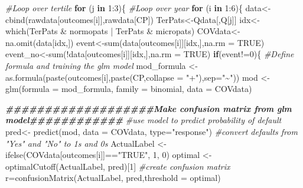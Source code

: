 \documentclass[
]{article}
\newenvironment{Shaded}{\begin{snugshade}}{\end{snugshade}}
\newcommand{\AttributeTok}[1]{\textcolor[rgb]{0.77,0.63,0.00}{#1}}
\newcommand{\CommentTok}[1]{\textcolor[rgb]{0.56,0.35,0.01}{\textit{#1}}}
\newcommand{\ConstantTok}[1]{\textcolor[rgb]{0.00,0.00,0.00}{#1}}
\newcommand{\ControlFlowTok}[1]{\textcolor[rgb]{0.13,0.29,0.53}{\textbf{#1}}}
\newcommand{\DecValTok}[1]{\textcolor[rgb]{0.00,0.00,0.81}{#1}}
\newcommand{\DocumentationTok}[1]{\textcolor[rgb]{0.56,0.35,0.01}{\textbf{\textit{#1}}}}
\newcommand{\FunctionTok}[1]{\textcolor[rgb]{0.00,0.00,0.00}{#1}}
\newcommand{\NormalTok}[1]{#1}
\newcommand{\OtherTok}[1]{\textcolor[rgb]{0.56,0.35,0.01}{#1}}
\newcommand{\SpecialCharTok}[1]{\textcolor[rgb]{0.00,0.00,0.00}{#1}}
\newcommand{\StringTok}[1]{\textcolor[rgb]{0.31,0.60,0.02}{#1}}
\begin{document}
\begin{Shaded}
\begin{Highlighting}[]
\CommentTok{\#Loop over tertile}
\ControlFlowTok{for}\NormalTok{ (j }\ControlFlowTok{in} \DecValTok{1}\SpecialCharTok{:}\DecValTok{3}\NormalTok{)\{}
  \CommentTok{\#Loop over year}
  \ControlFlowTok{for}\NormalTok{ (i }\ControlFlowTok{in} \DecValTok{1}\SpecialCharTok{:}\DecValTok{6}\NormalTok{)\{}
\NormalTok{    data}\OtherTok{\textless{}{-}}\FunctionTok{cbind}\NormalTok{(rawdata[outcomes[i]],rawdata[CP])}
\NormalTok{    TerPats}\OtherTok{\textless{}{-}}\NormalTok{Qdata[,Q[j]]}
\NormalTok{    idx}\OtherTok{\textless{}{-}}\FunctionTok{which}\NormalTok{(TerPats }\SpecialCharTok{\&}\NormalTok{ normopats }\SpecialCharTok{|}\NormalTok{ TerPats }\SpecialCharTok{\&}\NormalTok{ micropats)}
\NormalTok{    COVdata}\OtherTok{\textless{}{-}}\FunctionTok{na.omit}\NormalTok{(data[idx,])}
\NormalTok{    event}\OtherTok{\textless{}{-}}\FunctionTok{sum}\NormalTok{(data[outcomes[i]][idx,],}\AttributeTok{na.rm =} \ConstantTok{TRUE}\NormalTok{)}
\NormalTok{    event\_no}\OtherTok{\textless{}{-}}\FunctionTok{sum}\NormalTok{(}\SpecialCharTok{!}\NormalTok{data[outcomes[i]][idx,],}\AttributeTok{na.rm =} \ConstantTok{TRUE}\NormalTok{)}
    \ControlFlowTok{if}\NormalTok{(event}\SpecialCharTok{!=}\DecValTok{0}\NormalTok{)\{}
    \CommentTok{\#Define formula and training the glm model}
\NormalTok{    mod\_formula }\OtherTok{\textless{}{-}} \FunctionTok{as.formula}\NormalTok{(}\FunctionTok{paste}\NormalTok{(outcomes[i],}\FunctionTok{paste}\NormalTok{(CP,}\AttributeTok{collapse =} \StringTok{"+"}\NormalTok{),}\AttributeTok{sep=}\StringTok{"\textasciitilde{}"}\NormalTok{))}
\NormalTok{    mod }\OtherTok{\textless{}{-}} \FunctionTok{glm}\NormalTok{(}\AttributeTok{formula =}\NormalTok{ mod\_formula, }\AttributeTok{family =}\NormalTok{ binomial, }\AttributeTok{data =}\NormalTok{ COVdata)}
  
  
    \DocumentationTok{\#\#\#\#\#\#\#\#\#\#\#\#\#\#\#\#\#\#\#Make confusion matrix from glm model\#\#\#\#\#\#\#\#\#\#\#\#}
    \CommentTok{\#use model to predict probability of default}
\NormalTok{    pred}\OtherTok{\textless{}{-}} \FunctionTok{predict}\NormalTok{(mod, }\AttributeTok{data =}\NormalTok{ COVdata, }\AttributeTok{type=}\StringTok{"response"}\NormalTok{)}
    \CommentTok{\#convert defaults from "Yes" and "No" to 1\textquotesingle{}s and 0\textquotesingle{}s}
\NormalTok{    ActualLabel }\OtherTok{\textless{}{-}} \FunctionTok{ifelse}\NormalTok{(COVdata[outcomes[i]]}\SpecialCharTok{==}\StringTok{"TRUE"}\NormalTok{, }\DecValTok{1}\NormalTok{, }\DecValTok{0}\NormalTok{)}
\NormalTok{    optimal }\OtherTok{\textless{}{-}} \FunctionTok{optimalCutoff}\NormalTok{(ActualLabel, pred)[}\DecValTok{1}\NormalTok{]}
    \CommentTok{\#create confusion matrix}
\NormalTok{    r}\OtherTok{=}\FunctionTok{confusionMatrix}\NormalTok{(ActualLabel, pred,}\AttributeTok{threshold =}\NormalTok{ optimal)}
  

\end{Highlighting}
\end{Shaded}
\end{document}
